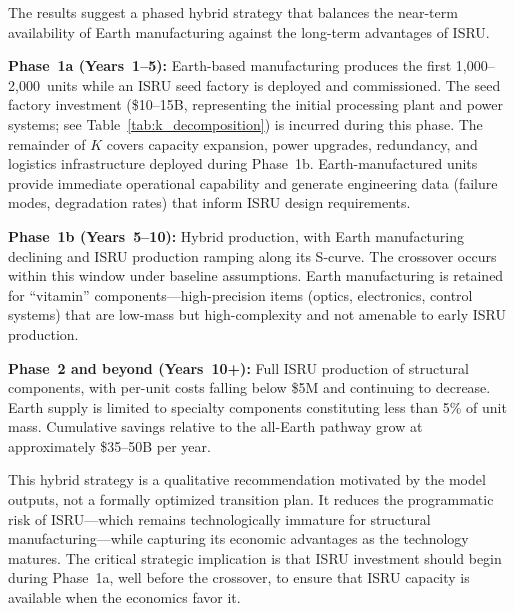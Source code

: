 \documentclass[preprint,12pt]{elsarticle}
\begin{document}
The results suggest a phased hybrid strategy that balances the near-term availability of Earth manufacturing against the long-term advantages of ISRU.

\textbf{Phase~1a (Years~1--5):} Earth-based manufacturing produces the first 1{,}000--2{,}000~units while an ISRU seed factory is deployed and commissioned. The seed factory investment (\$10--15B, representing the initial processing plant and power systems; see Table~\ref{tab:k_decomposition}) is incurred during this phase. The remainder of $K$ covers capacity expansion, power upgrades, redundancy, and logistics infrastructure deployed during Phase~1b. Earth-manufactured units provide immediate operational capability and generate engineering data (failure modes, degradation rates) that inform ISRU design requirements.

\textbf{Phase~1b (Years~5--10):} Hybrid production, with Earth manufacturing declining and ISRU production ramping along its S-curve. The crossover occurs within this window under baseline assumptions. Earth manufacturing is retained for ``vitamin'' components---high-precision items (optics, electronics, control systems) that are low-mass but high-complexity and not amenable to early ISRU production.

\textbf{Phase~2 and beyond (Years~10+):} Full ISRU production of structural components, with per-unit costs falling below \$5M and continuing to decrease. Earth supply is limited to specialty components constituting less than 5\% of unit mass. Cumulative savings relative to the all-Earth pathway grow at approximately \$35--50B per year.

This hybrid strategy is a qualitative recommendation motivated by the model outputs, not a formally optimized transition plan. It reduces the programmatic risk of ISRU---which remains technologically immature for structural manufacturing---while capturing its economic advantages as the technology matures. The critical strategic implication is that ISRU investment should begin during Phase~1a, well before the crossover, to ensure that ISRU capacity is available when the economics favor it.
\end{document}
